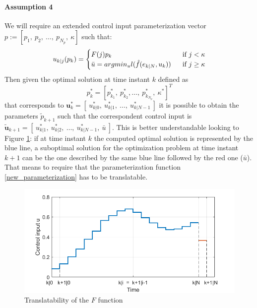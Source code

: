 \paragraph{Assumption 4} We will require an extended control input parameterization vector $p:=[p_1,\ p_2,\ \dots,\ p_{N_p},\ \kappa]$ such that: 
\begin{equation}
\begin{split}\label{new_parameterization}
    u_{k|j}(p_k)=
        \begin{cases}
            F(j){p_k}\ \ \ \ \   &\textnormal{if } j<\kappa \\
            \bar{u}=argmin_u l(\hat{f}(e_{k|N},u_k))\ \ &\textnormal{if } j\ge \kappa
        \end{cases}
    \end{split}
\end{equation} 
Then given the optimal solution at time instant $k$ defined as $$p_k^*=\left[ p_{k_1}^*,\ p_{k_2}^*,  \dots,\ p_{k_{N_p}}^*,\ \kappa^* \right]^T$$ that corresponds to $  \textbf{u}_k^*=[\ u_{k|0}^*,\ u_{k|1}^*,\  \dots,\  u_{k|{N-1}}^*\ ]$ it is possible to obtain the parameters $\tilde{p}_{k+1}$ such that the correspondent control input is $  \tilde{\textbf{u}}_{k+1}=[\ u_{k|1}^*,\ u_{k|2}^*,\  \dots,\  u_{k|{N-1}}^*,\ \bar{u} \ ]$. This is better understandable looking to Figure \ref{param_translatability}: if at time instant $k$ the computed optimal solution is represented by the blue line, a suboptimal solution for the optimization problem at time instant $k+1$ can be the one described by the same blue line followed by the red one ($\bar{u}$).
That means to require that the parameterization function \ref{new_parameterization} has to be translatable.
\begin{figure}[h!]
	\centering
	\includegraphics[scale=0.6]{IMMAGINI/trans_u.png}
	\caption{Translatability of the $F$ function}
	\label{param_translatability}
\end{figure}

